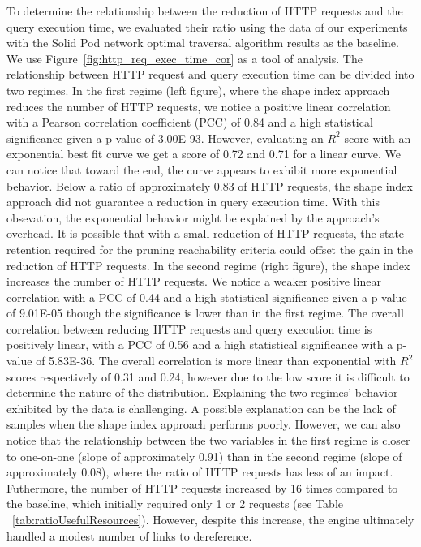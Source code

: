 To determine the relationship between the reduction of HTTP requests and the query execution time, we evaluated their ratio using 
the data of our experiments with the Solid Pod network optimal traversal algorithm results as the baseline.
We use Figure~\ref{fig:http_req_exec_time_cor} as a tool of analysis.
The relationship between HTTP request and query execution time can be divided into two regimes.
In the first regime (left figure), where the shape index approach reduces the number of HTTP requests, we notice a positive linear correlation with a
Pearson correlation coefficient (PCC) of 0.84 and a high statistical significance given a p-value of 3.00E-93.
However, evaluating an $R^2$ score with an exponential best fit curve we get a score of 0.72 and 0.71 for a linear curve.
We can notice that toward the end, the curve appears to exhibit more exponential behavior.
Below a ratio of approximately 0.83 of HTTP requests, the shape index approach did not guarantee a reduction in query execution time.
With this obsevation, the exponential behavior might be explained by the approach's overhead. 
It is possible that with a small reduction of HTTP requests, the state retention required for the pruning reachability criteria could offset the gain in the reduction of HTTP requests.
In the second regime (right figure), the shape index increases the number of HTTP requests.
We notice a weaker positive linear correlation with a PCC of 0.44 and a high statistical significance given a p-value of 9.01E-05 though the significance is lower than in the first regime.
The overall correlation between reducing HTTP requests and query execution time is positively linear, with a PCC of 0.56 and a high statistical significance with a p-value of 5.83E-36.
The overall correlation is more linear than exponential with $R^2$ scores respectively of 0.31 and 0.24, however due to the low score it is difficult to determine the nature of the distribution.
Explaining the two regimes' behavior exhibited by the data is challenging.
A possible explanation can be the lack of samples when the shape index approach performs poorly.
However, we can also notice that the relationship between the two variables in the first regime is closer to one-on-one (slope of approximately 0.91) than in the second regime (slope of approximately 0.08), where the ratio of HTTP requests has less of an impact.
Futhermore, the number of HTTP requests increased by 16 times compared to the baseline, which initially required only 1 or 2 requests (see Table ~\ref{tab:ratioUsefulResources}). 
However, despite this increase, the engine ultimately handled a modest number of links to dereference.
